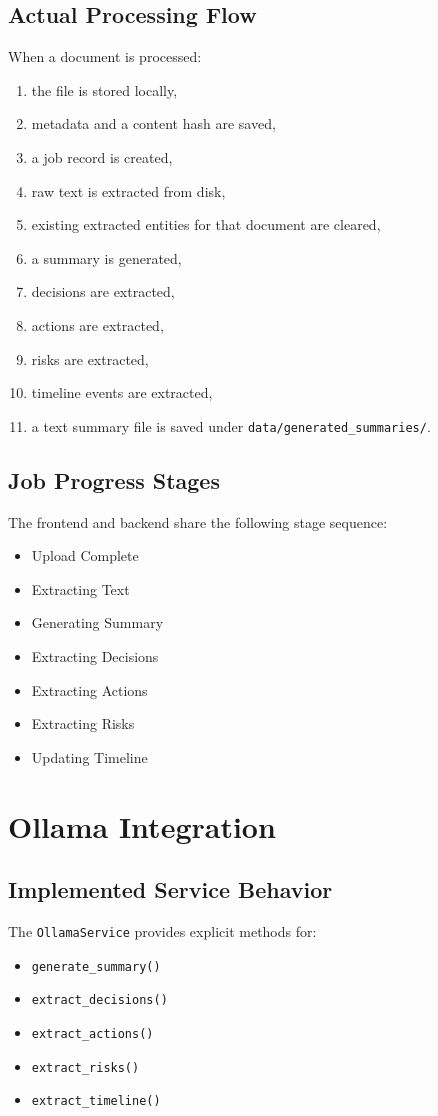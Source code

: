 \documentclass[12pt, a4paper]{article}
\begin{document}
\subsection{Actual Processing Flow}
When a document is processed:
\begin{enumerate}
\item the file is stored locally,
\item metadata and a content hash are saved,
\item a job record is created,
\item raw text is extracted from disk,
\item existing extracted entities for that document are cleared,
\item a summary is generated,
\item decisions are extracted,
\item actions are extracted,
\item risks are extracted,
\item timeline events are extracted,
\item a text summary file is saved under \texttt{data/generated\_summaries/}.
\end{enumerate}

\subsection{Job Progress Stages}
The frontend and backend share the following stage sequence:
\begin{itemize}
\item Upload Complete
\item Extracting Text
\item Generating Summary
\item Extracting Decisions
\item Extracting Actions
\item Extracting Risks
\item Updating Timeline
\end{itemize}

\section{Ollama Integration}
\subsection{Implemented Service Behavior}
The \texttt{OllamaService} provides explicit methods for:
\begin{itemize}
\item \texttt{generate\_summary()}
\item \texttt{extract\_decisions()}
\item \texttt{extract\_actions()}
\item \texttt{extract\_risks()}
\item \texttt{extract\_timeline()}
\end{itemize}
\end{document}
